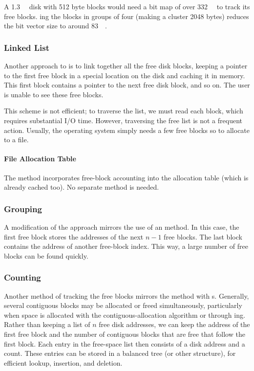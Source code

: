 A \SI{1.3}{\gibi{} \byte{}} disk with 512 byte blocks would need a bit map of over \SI{332}{\kibi{} \byte{}} to track its free blocks.
ing the blocks in groups of four (making a cluster 2048 bytes) reduces the bit vector size to around \SI{83}{\kibi{} \byte{}}.

\subsubsection{Linked List}\label{subsubsec:Free_Space_Linked_List}
Another approach to  is to link together all the free disk blocks, keeping a pointer to the first free block in a special location on the disk and caching it in memory.
This first block contains a pointer to the next free disk block, and so on.
The user is unable to see these free blocks.

This scheme is not efficient; to traverse the list, we must read each block, which requires substantial I/O time.
However, traversing the free list is not a frequent action.
Usually, the operating system simply needs a few free blocks so to allocate to a file.

\paragraph{File Allocation Table}\label{par:FAT_Free_Space}
The  method incorporates free-block accounting into the allocation table (which is already cached too).
No separate method is needed.

\subsubsection{Grouping}\label{subsubsec:Free_Space_Grouping}
A modification of the  approach mirrors the use of an  method.
In this case, the first free block stores the addresses of the next $n-1$ free blocks.
The last block contains the address of another free-block index.
This way, a large number of free blocks can be found quickly.

\subsubsection{Counting}\label{subsubsec:Free_Space_Counting}
Another method of tracking the free blocks mirrors the  method with s.
Generally, several contiguous blocks may be allocated or freed simultaneously, particularly when space is allocated with the contiguous-allocation algorithm or through ing.
Rather than keeping a list of $n$ free disk addresses, we can keep the address of the first free block and the number of contiguous blocks that are free that follow the first block.
Each entry in the free-space list then consists of a disk address and a count.
These entries can be stored in a balanced tree (or other structure), for efficient lookup, insertion, and deletion.

